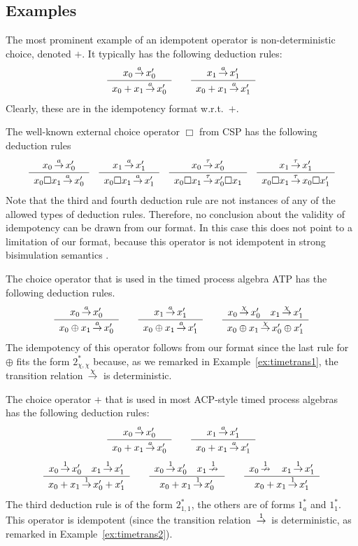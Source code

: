 \subsection{Examples} %

\begin{example}
The most prominent example of an idempotent operator is non-deterministic choice, denoted $+$. It typically has the following deduction rules:
\[
\sosrule{x_0 \trans{a} x_0'}{x_0 + x_1 \trans{a} x_0'} \qquad
\sosrule{x_1 \trans{a} x_1'}{x_0 + x_1 \trans{a} x_1'}
\]
Clearly, these are in the idempotency format w.r.t.\ $+$.
\end{example}

\begin{example}
The well-known external choice operator $\Box$ from CSP \cite{Hoare85} has the following deduction rules
\[
\sosrule{x_0 \trans{a} x'_0}{x_0 \Box x_1 \trans{a} x'_0}
\quad
\sosrule{x_1 \trans{a} x'_1}{x_0 \Box x_1 \trans{a} x'_1}
\quad
\sosrule{x_0 \trans{\tau} x'_0}{x_0 \Box x_1 \trans{\tau} x'_0 \Box x_1}
\quad
\sosrule{x_1 \trans{\tau} x'_1}{x_0 \Box x_1 \trans{\tau} x_0 \Box x'_1}
\]
Note that the third and fourth deduction rule are not instances of any of the allowed types of deduction rules.
Therefore, no conclusion about the validity of idempotency can be drawn from our format.
In this case this does not point to a limitation of our format,
because this operator is not idempotent in strong bisimulation semantics \cite{dArgenio95}.
\end{example}

\begin{example}
The choice operator that is used in the timed process algebra ATP \cite{Nicollin94} has the following deduction rules.
\[
\sosrule{x_0 \trans{a} x'_0}{x_0 \oplus x_1 \trans{a} x'_0}
\qquad
\sosrule{x_1 \trans{a} x'_1}{x_0 \oplus x_1 \trans{a} x'_1}
\qquad
\sosrule{x_0 \trans{\chi} x'_0 \quad x_1 \trans{\chi} x'_1}{x_0 \oplus x_1 \trans{\chi} x'_0 \oplus x'_1}
\]
The idempotency of this operator follows from our format since the last rule for $\oplus$ fits
the form $2_{\chi,\chi}^*$ because, as we remarked in Example~\ref{ex:timetrans1}, the transition relation
$\,{\stackrel{{\chi}}{\rightarrow}}\,$ is deterministic.
\end{example}

\begin{example}
The choice operator $+$ that is used in most ACP-style timed process algebras~\cite{Baeten02} has the following deduction rules:
\[
\sosrule{x_0 \trans{a} x_0'}{x_0 + x_1 \trans{a} x_0'} \qquad
\sosrule{x_1 \trans{a} x_1'}{x_0 + x_1 \trans{a} x_1'}\]
\[\sosrule{x_0 \trans{1} x'_0 \quad x_1 \trans{1} x'_1}{x_0 + x_1 \trans{1} x'_0 + x'_1} \qquad
\sosrule{x_0 \trans{1} x'_0 \quad x_1 \ntrans{1}}{x_0 + x_1 \trans{1} x'_0} \qquad
\sosrule{x_0 \ntrans{1}  \quad x_1 \trans{1} x'_1}{x_0 + x_1 \trans{1} x'_1}
\]
The third deduction rule is of the form $2^*_{1,1}$, the others are of forms $1^*_a$ and $1^*_1$.
This operator is idempotent (since the transition relation $\,{\stackrel{{1}}{\rightarrow}}\,$ is deterministic, as remarked
in Example~\ref{ex:timetrans2}).
\end{example}


